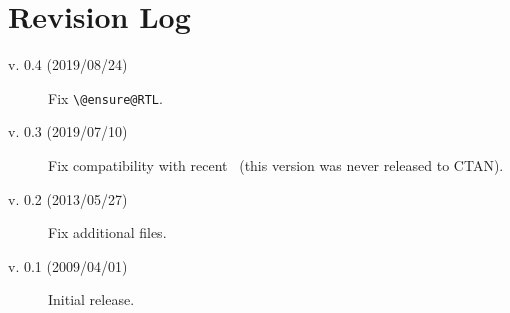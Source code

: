 \documentclass{article}
\newcommand*{\cmd}[1]{\texttt{\textbackslash #1}}
\begin{document}
\section{Revision Log}

\begin{description}
	\item[v. 0.4 (2019/08/24)] Fix \cmd{@ensure@RTL}.
	\item[v. 0.3 (2019/07/10)] Fix compatibility with recent \LuaTeX\ (this version was never released to CTAN).
	\item[v. 0.2 (2013/05/27)] Fix additional files.
	\item[v. 0.1 (2009/04/01)] Initial release.
\end{description}
\end{document}
